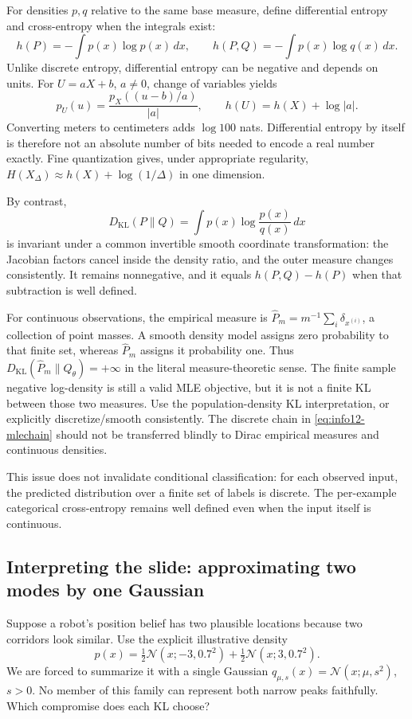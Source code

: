 For densities $p,q$ relative to the same base measure, define differential
entropy and cross-entropy when the integrals exist:
\[
h(P)=-\int p(x)\log p(x)\,dx,\qquad
h(P,Q)=-\int p(x)\log q(x)\,dx.
\]
Unlike discrete entropy, differential entropy can be negative and depends on
units. For $U=aX+b$, $a\ne0$, change of variables yields
\[
p_U(u)=\frac{p_X((u-b)/a)}{|a|},\qquad
h(U)=h(X)+\log|a|.
\]
Converting meters to centimeters adds $\log100$ nats. Differential entropy by
itself is therefore not an absolute number of bits needed to encode a real
number exactly. Fine quantization gives, under appropriate regularity,
$H(X_\Delta)\approx h(X)+\log(1/\Delta)$ in one dimension.

By contrast,
\[
D_{\mathrm{KL}}(P\|Q)=\int p(x)\log\frac{p(x)}{q(x)}\,dx
\]
is invariant under a common invertible smooth coordinate transformation: the
Jacobian factors cancel inside the density ratio, and the outer measure changes
consistently. It remains nonnegative, and it equals $h(P,Q)-h(P)$ when that
subtraction is well defined.

\begin{warning}
For continuous observations, the empirical measure is
$\hat P_m=m^{-1}\sum_i\delta_{x^{(i)}}$, a collection of point masses.
A smooth density model assigns zero probability to that finite set, whereas
$\hat P_m$ assigns it probability one. Thus
$D_{\mathrm{KL}}(\hat P_m\|Q_\theta)=+\infty$ in the literal measure-theoretic
sense. The finite sample negative log-density is still a valid MLE objective,
but it is not a finite KL between those two measures. Use the population-density
KL interpretation, or explicitly discretize/smooth consistently. The discrete
chain in \eqref{eq:info12-mlechain} should not be transferred blindly to Dirac
empirical measures and continuous densities.
\end{warning}

This issue does not invalidate conditional classification: for each observed
input, the predicted distribution over a finite set of labels is discrete.
The per-example categorical cross-entropy remains well defined even when the
input itself is continuous.

\subsection{Interpreting the slide: approximating two modes by one Gaussian}
Suppose a robot's position belief has two plausible locations because two
corridors look similar. Use the explicit illustrative density
\[
p(x)=\tfrac12\mathcal N(x;-3,0.7^2)+\tfrac12\mathcal N(x;3,0.7^2).
\]
We are forced to summarize it with a single Gaussian
$q_{\mu,s}(x)=\mathcal N(x;\mu,s^2)$, $s>0$. No member of this family can
represent both narrow peaks faithfully. Which compromise does each KL choose?

